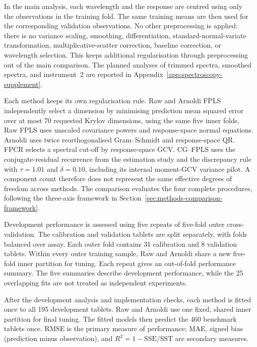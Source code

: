 In the main analysis, each wavelength and the response are centred using
only the observations in the training fold.  The same training means are
then used for the corresponding validation observations.  No other
preprocessing is applied: there is no variance scaling, smoothing,
differentiation, standard-normal-variate transformation, multiplicative-scatter
correction, baseline correction, or wavelength selection.  This keeps
additional regularisation through preprocessing out of the main comparison.
The planned analyses of trimmed spectra, smoothed spectra, and instrument~2
are reported in Appendix~\ref{app:spectroscopy-supplement}.

Each method keeps its own regularisation rule.  Raw and Arnoldi FPLS
independently select a dimension by minimising prediction mean squared error over at most
70 requested Krylov dimensions, using the same five inner folds.  Raw FPLS
uses unscaled covariance powers and response-space normal equations.
Arnoldi uses twice reorthogonalised Gram--Schmidt and response-space QR.
FPCR selects a spectral cut-off by response-space GCV.  CG--FPLS uses the
conjugate-residual recurrence from the estimation study and the discrepancy
rule with $\tau=1.01$ and $\delta=0.10$, including its internal moment-GCV
variance pilot.  A component count therefore does not represent the same
effective degrees of freedom across methods.  The comparison evaluates the
four complete procedures, following the three-axis framework in
Section~\ref{sec:methods-comparison-framework}.

Development performance is assessed using five repeats of five-fold outer
cross-validation.  The calibration and validation tablets are split
separately, with folds balanced over assay.  Each outer fold contains
31 calibration and 8 validation tablets.  Within every outer training
sample, Raw and Arnoldi share a new five-fold inner partition for tuning.
Each repeat gives an out-of-fold performance summary.  The five summaries
describe development performance, while the 25 overlapping fits are not
treated as independent experiments.

After the development analysis and implementation checks, each method is
fitted once to all 195 development tablets.  Raw and Arnoldi use one fixed,
shared inner partition for final tuning.  The fitted models then predict
the 460 benchmark tablets once.  RMSE is the primary measure of performance;
MAE, signed bias (prediction minus observation), and
$R^2=1-\mathrm{SSE}/\mathrm{SST}$ are secondary measures.

